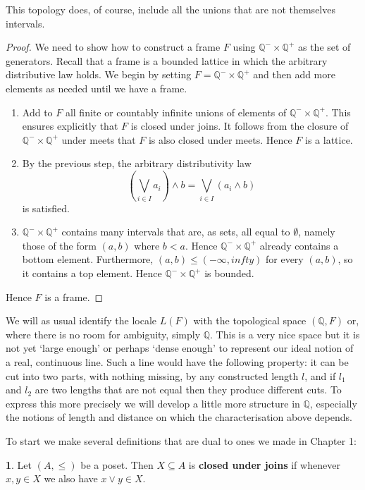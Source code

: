 \documentclass[oneside,english]{amsbook}
\numberwithin{section}{chapter}
\theoremstyle{plain}
\theoremstyle{definition}
\newtheorem{defn}[thm]{\protect\definitionname}
\providecommand{\definitionname}{Definition}
\begin{document}
This topology does, of course, include all the unions that are not themselves intervals.

\begin{proof}
	We need to show how to construct a frame $F$ using $\mathbb{Q}^-\times\mathbb{Q}^+$ as the set of generators. Recall that a frame is a bounded lattice in which the arbitrary distributive law holds. We begin by setting $F=\mathbb{Q}^-\times\mathbb{Q}^+$ and then add more elements as needed until we have a frame.
	\begin{enumerate}
		\item Add to $F$ all finite or countably infinite unions of elements of $\mathbb{Q}^-\times\mathbb{Q}^+$. This ensures explicitly that $F$ is closed under joins. It follows from the closure of $\mathbb{Q}^-\times\mathbb{Q}^+$ under meets that $F$ is also closed under meets. Hence $F$ is a lattice.
		\item By the previous step, the arbitrary distributivity law
			\[ (\bigvee_{i\in I}a_{i})\land b=\bigvee_{i\in I}(a_{i}\land b) \]
			is satisfied.
		\item $\mathbb{Q}^-\times\mathbb{Q}^+$ contains many intervals that are, as sets, all equal to $\emptyset$, namely those of the form $(a, b)$ where $b<a$. Hence $\mathbb{Q}^-\times\mathbb{Q}^+$ already contains a bottom element. Furthermore, $(a, b)\le (-\infty, infty)$ for every $(a, b)$, so it contains a top element. Hence $\mathbb{Q}^-\times\mathbb{Q}^+$ is bounded.
	\end{enumerate}
	Hence $F$ is a frame.
\end{proof}

We will as usual identify the locale $L(F)$ with the topological space $(\mathbb{Q}, F)$ or, where there is no room for ambiguity, simply $\mathbb{Q}$. This is a very nice space but it is not yet `large enough' or perhaps `dense enough' to represent our ideal notion of a real, continuous line. Such a line would have the following property: it can be cut into two parts, with nothing missing, by any constructed length $l$, and if $l_1$ and $l_2$ are two lengths that are not equal then they produce different cuts. To express this more precisely we will develop a little more structure in $\mathbb{Q}$, especially the notions of length and distance on which the characterisation above depends.

To start we make several definitions that are dual to ones we made in Chapter 1:

\begin{defn}
	Let $(A, \le)$ be a poset. Then $X\subseteq A$ is \textbf{closed under joins} if whenever $x,y\in X$ we also have $x\lor y\in X$.
\end{defn}
\end{document}
